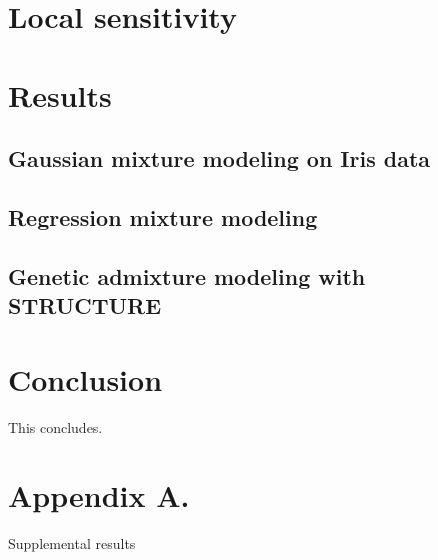 \documentclass[twoside,11pt]{article}
\begin{document}
\section{Local sensitivity}


\section{Results}

\subsection{Gaussian mixture modeling on Iris data}

\subsection{Regression mixture modeling}


\subsection{Genetic admixture modeling with STRUCTURE}


\section{Conclusion}
This concludes.




\newpage

\appendix
\section*{Appendix A.}
\label{app:theorem}

Supplemental results

\vskip 0.2in

\end{document}
